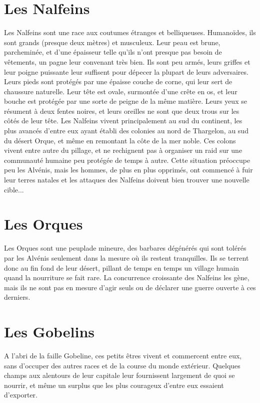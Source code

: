 \section{Les Nalfeins}
Les Nalfeins sont une race aux coutumes étranges et belliqueuses. Humanoïdes, ils sont grands (presque deux mètres) et musculeux. Leur peau est brune, parcheminée, et d'une épaisseur telle qu'ils n'ont presque pas besoin de vêtements, un pagne leur convenant très bien. Ils sont peu armés, leurs griffes et leur poigne puissante leur suffisent pour dépecer la plupart de leurs adversaires. Leurs pieds sont protégés par une épaisse couche de corne, qui leur sert de chaussure naturelle. Leur tête est ovale, surmontée d'une crête en os, et leur bouche est protégée par une sorte de peigne de la même matière. Leurs yeux se résument à deux fentes noires, et leurs oreilles ne sont que deux trous sur les côtés de leur tête. Les Nalfeins vivent principalement au sud du continent, les plus avancés d'entre eux ayant établi des colonies au nord de Thargelon, au sud du désert Orque, et même en remontant la côte de la mer noble. Ces colons vivent entre autre du pillage, et ne rechignent pas à organiser un raid sur une communauté humaine peu protégée de temps à autre. Cette situation préoccupe peu les Alvénis, mais les hommes, de plus en plus opprimés, ont commencé à fuir leur terres natales et les attaques des Nalfeins doivent bien trouver une nouvelle cible...

\section{Les Orques}
Les Orques sont une peuplade mineure, des barbares dégénérés qui sont tolérés par les Alvénis seulement dans la mesure où ils restent tranquilles. Ils se terrent donc au fin fond de leur désert, pillant de temps en temps un village humain quand la nourriture se fait rare. La concurrence croissante des Nalfeins les gène, mais ils ne sont pas en mesure d'agir seuls ou de déclarer une guerre ouverte à ces derniers.

\section{Les Gobelins}
A l'abri de la faille Gobeline, ces petits êtres vivent et commercent entre eux, sans d'occuper des autres races et de la course du monde extérieur. Quelques champs aux alentours de leur capitale leur fournissent largement de quoi se nourrir, et même un surplus que les plus courageux d'entre eux essaient d'exporter.